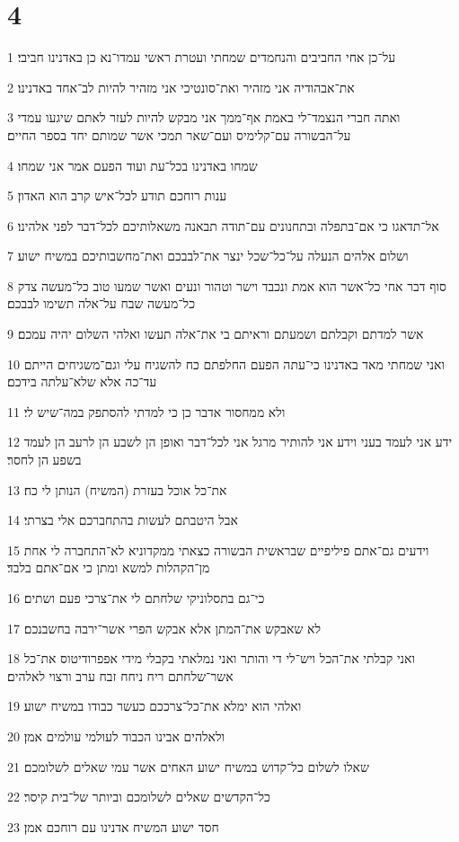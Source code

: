 \chapter{4}

\par 1 על־כן אחי החביבים והנחמדים שמחתי ועטרת ראשי עמדו־נא כן באדנינו חביבי׃
\par 2 את־אבהודיה אני מזהיר ואת־סונטיכי אני מזהיר להיות לב־אחד באדנינו׃
\par 3 ואתה חברי הנצמד־לי באמת אף־ממך אני מבקש להיות לעזר לאתם שיגעו עמדי על־הבשורה עם־קלימיס ועם־שאר תמכי אשר שמותם יחד בספר החיים׃
\par 4 שמחו באדנינו בכל־עת ועוד הפעם אמר אני שמחו׃
\par 5 ענות רוחכם תודע לכל־איש קרב הוא האדון׃
\par 6 אל־תדאגו כי אם־בתפלה ובתחנונים עם־תודה תבאנה משאלותיכם לכל־דבר לפני אלהינו׃
\par 7 ושלום אלהים הנעלה על־כל־שכל ינצר את־לבבכם ואת־מחשבותיכם במשיח ישוע׃
\par 8 סוף דבר אחי כל־אשר הוא אמת ונכבד וישר וטהור ונעים ואשר שמעו טוב כל־מעשה צדק כל־מעשה שבח על־אלה תשימו לבבכם׃
\par 9 אשר למדתם וקבלתם ושמעתם וראיתם בי את־אלה תעשו ואלהי השלום יהיה עמכם׃
\par 10 ואני שמחתי מאד באדנינו כי־עתה הפעם החלפתם כח להשגיח עלי וגם־משגיחים הייתם עד־כה אלא שלא־עלתה בידכם׃
\par 11 ולא ממחסור אדבר כן כי למדתי להסתפק במה־שיש לי׃
\par 12 ידע אני לעמד בעני וידע אני להותיר מרגל אני לכל־דבר ואופן הן לשבע הן לרעב הן לעמד בשפע הן לחסר׃
\par 13 את־כל אוכל בעזרת (המשיח) הנותן לי כח׃
\par 14 אבל היטבתם לעשות בהתחברכם אלי בצרתי׃
\par 15 וידעים גם־אתם פיליפיים שבראשית הבשורה כצאתי ממקדוניא לא־התחברה לי אחת מן־הקהלות למשא ומתן כי אם־אתם בלבד׃
\par 16 כי־גם בתסלוניקי שלחתם לי את־צרכי פעם ושתים׃
\par 17 לא שאבקש את־המתן אלא אבקש הפרי אשר־ירבה בחשבנכם׃
\par 18 ואני קבלתי את־הכל ויש־לי די והותר ואני נמלאתי בקבלי מידי אפפרודיטוס את־כל אשר־שלחתם ריח ניחח זבח ערב ורצוי לאלהים׃
\par 19 ואלהי הוא ימלא את־כל־צרככם כעשר כבודו במשיח ישוע׃
\par 20 ולאלהים אבינו הכבוד לעולמי עולמים אמן׃
\par 21 שאלו לשלום כל־קדוש במשיח ישוע האחים אשר עמי שאלים לשלומכם׃
\par 22 כל־הקדשים שאלים לשלומכם וביותר של־בית קיסר׃
\par 23 חסד ישוע המשיח אדנינו עם רוחכם אמן׃



